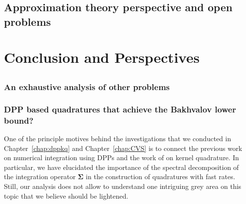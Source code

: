 \documentclass[twoside,11pt]{book}
\numberwithin{theorem}{chapter}
\numberwithin{definition}{chapter}
\numberwithin{proposition}{chapter}
\numberwithin{corollary}{chapter}
\numberwithin{example}{chapter}
\numberwithin{lemma}{chapter}
\numberwithin{assumption}{chapter}
\numberwithin{equation}{chapter}
\numberwithin{figure}{chapter}
\begin{document}
\section{Approximation theory perspective and open problems}


\chapter{Conclusion and Perspectives}\label{chap:conclusion}

\section{\Large\selectfont{Conclusion}}

\section{\Large\selectfont{Perspectives}}
\subsection{An exhaustive analysis of other problems}
\subsection{DPP based quadratures that achieve the Bakhvalov lower bound?}\label{sec:bakhvalov}

One of the principle motives behind the investigations that we conducted in Chapter~\ref{chap:dppkq} and Chapter~\ref{chap:CVS} is to connect the previous work on numerical integration using DPPs
\citep{BaHa16,CoMaAm20} and the work of \citep{Bac17} on kernel quadrature. In particular, we have elucidated the importance of the spectral decomposition of the integration operator $\bm{\Sigma}$ in the construction of quadratures with fast rates. Still, our analysis does not allow to understand one intriguing grey area
on this topic that we believe should be lightened.
\end{document}
